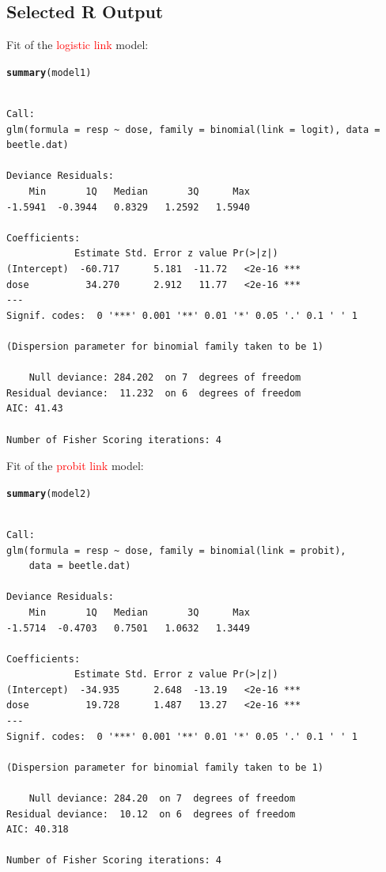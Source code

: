 \documentclass[oneside]{book}\usepackage[]{graphicx}\usepackage[svgnames]{xcolor}
\makeatletter
\newcommand{\hlstd}[1]{\textcolor[rgb]{0.345,0.345,0.345}{#1}}%
\newcommand{\hlkwd}[1]{\textcolor[rgb]{0.737,0.353,0.396}{\textbf{#1}}}%
\newenvironment{kframe}{%
 \def\at@end@of@kframe{}%
 \ifinner\ifhmode%
  \def\at@end@of@kframe{\end{minipage}}%
  \begin{minipage}{\columnwidth}%
 \fi\fi%
 \def\FrameCommand##1{\hskip\@totalleftmargin \hskip-\fboxsep
 \colorbox{shadecolor}{##1}\hskip-\fboxsep
     \hskip-\linewidth \hskip-\@totalleftmargin \hskip\columnwidth}%
 \MakeFramed {\advance\hsize-\width
   \@totalleftmargin\z@ \linewidth\hsize
   \@setminipage}}%
 {\par\unskip\endMakeFramed%
 \at@end@of@kframe}
\newenvironment{knitrout}{}{} %
\makeatother
\begin{document}
\subsection*{Selected R Output}
Fit of the \textcolor{Red}{logistic link} model:
\begin{knitrout}
\color{fgcolor}\begin{kframe}
\begin{alltt}
\hlkwd{summary}\hlstd{(model1)}
\end{alltt}
\begin{verbatim}

Call:
glm(formula = resp ~ dose, family = binomial(link = logit), data = beetle.dat)

Deviance Residuals: 
    Min       1Q   Median       3Q      Max  
-1.5941  -0.3944   0.8329   1.2592   1.5940  

Coefficients:
            Estimate Std. Error z value Pr(>|z|)    
(Intercept)  -60.717      5.181  -11.72   <2e-16 ***
dose          34.270      2.912   11.77   <2e-16 ***
---
Signif. codes:  0 '***' 0.001 '**' 0.01 '*' 0.05 '.' 0.1 ' ' 1

(Dispersion parameter for binomial family taken to be 1)

    Null deviance: 284.202  on 7  degrees of freedom
Residual deviance:  11.232  on 6  degrees of freedom
AIC: 41.43

Number of Fisher Scoring iterations: 4
\end{verbatim}
\end{kframe}
\end{knitrout}
Fit of the \textcolor{Red}{probit link} model:
\begin{knitrout}
\color{fgcolor}\begin{kframe}
\begin{alltt}
\hlkwd{summary}\hlstd{(model2)}
\end{alltt}
\begin{verbatim}

Call:
glm(formula = resp ~ dose, family = binomial(link = probit), 
    data = beetle.dat)

Deviance Residuals: 
    Min       1Q   Median       3Q      Max  
-1.5714  -0.4703   0.7501   1.0632   1.3449  

Coefficients:
            Estimate Std. Error z value Pr(>|z|)    
(Intercept)  -34.935      2.648  -13.19   <2e-16 ***
dose          19.728      1.487   13.27   <2e-16 ***
---
Signif. codes:  0 '***' 0.001 '**' 0.01 '*' 0.05 '.' 0.1 ' ' 1

(Dispersion parameter for binomial family taken to be 1)

    Null deviance: 284.20  on 7  degrees of freedom
Residual deviance:  10.12  on 6  degrees of freedom
AIC: 40.318

Number of Fisher Scoring iterations: 4
\end{verbatim}
\end{kframe}
\end{knitrout}
\end{document}
